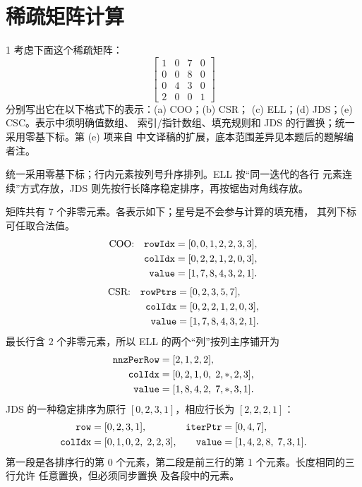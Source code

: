 \chapter{稀疏矩阵计算}

\begin{solutionexercise}{1}
\problemheading 考虑下面这个稀疏矩阵：
\[
\begin{bmatrix}
1&0&7&0\\0&0&8&0\\0&4&3&0\\2&0&0&1
\end{bmatrix}
\]
分别写出它在以下格式下的表示：\textup{(a)} COO；\textup{(b)} CSR；
\textup{(c)} ELL；\textup{(d)} JDS；\textup{(e)} CSC。表示中须明确值数组、
索引/指针数组、填充规则和 JDS 的行置换；统一采用零基下标。第 \textup{(e)} 项来自
中文译稿的扩展，底本范围差异见本题后的题解编者注。

\approachheading 统一采用零基下标；行内元素按列号升序排列。ELL 按“同一迭代的各行
元素连续”方式存放，JDS 则先按行长降序稳定排序，再按锯齿对角线存放。

\answerheading 矩阵共有 7 个非零元素。各表示如下；星号是不会参与计算的填充槽，
其列下标可任取合法值。
\begin{align*}
\text{COO:}\quad
 \code{rowIdx}&=[0,0,1,2,2,3,3],\\
 \code{colIdx}&=[0,2,2,1,2,0,3],\\
 \code{value}&=[1,7,8,4,3,2,1].
\end{align*}
\begin{align*}
\text{CSR:}\quad
 \code{rowPtrs}&=[0,2,3,5,7],\\
 \code{colIdx}&=[0,2,2,1,2,0,3],\\
 \code{value}&=[1,7,8,4,3,2,1].
\end{align*}
最长行含 2 个非零元素，所以 ELL 的两个“列”按列主序铺开为
\begin{align*}
 \code{nnzPerRow}&=[2,1,2,2],\\
 \code{colIdx}&=[0,2,1,0,\;2,*,2,3],\\
 \code{value}&=[1,8,4,2,\;7,*,3,1].
\end{align*}
JDS 的一种稳定排序为原行 $[0,2,3,1]$，相应行长为 $[2,2,2,1]$：
\begin{align*}
 \code{row}&=[0,2,3,1],&
 \code{iterPtr}&=[0,4,7],\\
 \code{colIdx}&=[0,1,0,2,\;2,2,3],&
 \code{value}&=[1,4,2,8,\;7,3,1].
\end{align*}
第一段是各排序行的第 0 个元素，第二段是前三行的第 1 个元素。长度相同的三行允许
任意置换，但必须同步置换  及各段中的元素。


\end{solutionexercise}
